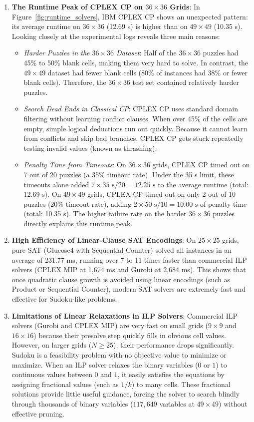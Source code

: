 \documentclass[a4paper,fleqn]{cas-sc}
\begin{document}
\begin{enumerate}
    \item \textbf{The Runtime Peak of CPLEX CP on $36 \times 36$ Grids}: In Figure~\ref{fig:runtime_solvers}, IBM CPLEX CP shows an unexpected pattern: its average runtime on $36 \times 36$ (12.69 s) is higher than on $49 \times 49$ (10.35 s). Looking closely at the experimental logs reveals three main reasons:
    \begin{itemize}
        \item \textit{Harder Puzzles in the $36 \times 36$ Dataset}: Half of the $36 \times 36$ puzzles had 45\% to 50\% blank cells, making them very hard to solve. In contrast, the $49 \times 49$ dataset had fewer blank cells (80\% of instances had 38\% or fewer blank cells). Therefore, the $36 \times 36$ test set contained relatively harder puzzles.
        \item \textit{Search Dead Ends in Classical CP}: CPLEX CP uses standard domain filtering without learning conflict clauses. When over 45\% of the cells are empty, simple logical deductions run out quickly. Because it cannot learn from conflicts and skip bad branches, CPLEX CP gets stuck repeatedly testing invalid values (known as thrashing).
        \item \textit{Penalty Time from Timeouts}: On $36 \times 36$ grids, CPLEX CP timed out on 7 out of 20 puzzles (a 35\% timeout rate). Under the 35 s limit, these timeouts alone added $7 \times 35\text{ s} / 20 = 12.25\text{ s}$ to the average runtime (total: 12.69 s). On $49 \times 49$ grids, CPLEX CP timed out on only 2 out of 10 puzzles (20\% timeout rate), adding $2 \times 50\text{ s} / 10 = 10.00\text{ s}$ of penalty time (total: 10.35 s). The higher failure rate on the harder $36 \times 36$ puzzles directly explains this runtime peak.
    \end{itemize}
    
    \item \textbf{High Efficiency of Linear-Clause SAT Encodings}: On $25 \times 25$ grids, pure SAT (Glucose4 with Sequential Counter) solved all instances in an average of 231.77 ms, running over 7 to 11 times faster than commercial ILP solvers (CPLEX MIP at 1,674 ms and Gurobi at 2,684 ms). This shows that once quadratic clause growth is avoided using linear encodings (such as Product or Sequential Counter), modern SAT solvers are extremely fast and effective for Sudoku-like problems.
    
    \item \textbf{Limitations of Linear Relaxations in ILP Solvers}: Commercial ILP solvers (Gurobi and CPLEX MIP) are very fast on small grids ($9 \times 9$ and $16 \times 16$) because their presolve step quickly fills in obvious cell values. However, on larger grids ($N \ge 25$), their performance drops significantly. Sudoku is a feasibility problem with no objective value to minimize or maximize. When an ILP solver relaxes the binary variables ($0$ or $1$) to continuous values between $0$ and $1$, it easily satisfies the equations by assigning fractional values (such as $1/k$) to many cells. These fractional solutions provide little useful guidance, forcing the solver to search blindly through thousands of binary variables ($117,649$ variables at $49 \times 49$) without effective pruning.
    

\end{enumerate}
\end{document}
